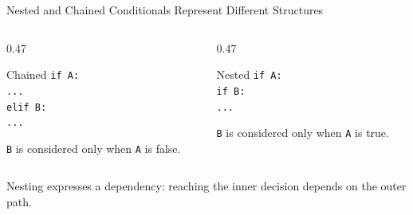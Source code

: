 \documentclass[aspectratio=169,10pt]{beamer}
\begin{document}
\begin{frame}{Nested and Chained Conditionals Represent Different Structures}
  \begin{columns}[T,onlytextwidth]
    \begin{column}{0.47\textwidth}
      \begin{block}{Chained}
        \texttt{if A:}\\
        \hspace*{0.16in}\texttt{...}\\
        \texttt{elif B:}\\
        \hspace*{0.16in}\texttt{...}
      \end{block}

      \texttt{B} is considered only when \texttt{A} is false.
    \end{column}

    \begin{column}{0.47\textwidth}
      \begin{block}{Nested}
        \texttt{if A:}\\
        \hspace*{0.16in}\texttt{if B:}\\
        \hspace*{0.32in}\texttt{...}
      \end{block}

      \texttt{B} is considered only when \texttt{A} is true.
    \end{column}
  \end{columns}

  \begin{keyidea}
    Nesting expresses a dependency: reaching the inner decision depends on the outer path.
  \end{keyidea}
\end{frame}
\end{document}
